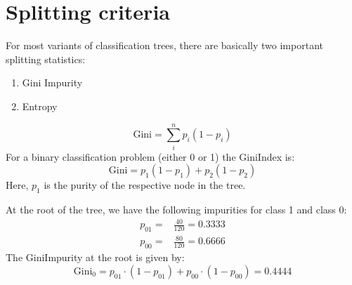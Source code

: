 \documentclass[letterpaper,10pt,english]{jupyterBook}
\begin{document}
\noindent{}


\section{Splitting criteria}
\label{\detokenize{Tree_Methods:splitting-criteria}}
\sphinxAtStartPar
For most variants of classification trees, there are basically two important splitting statistics:
\begin{enumerate}
%
\item {} 
\sphinxAtStartPar
Gini Impurity

\item {} 
\sphinxAtStartPar
Entropy

\end{enumerate}

\sphinxAtStartPar
{}
\label{equation:Tree_Methods:4ada277c-c74a-4ef0-a040-17abfa01fea7}\begin{equation}
\text{Gini} = \sum_i^n p_i (1-p_i)
\end{equation}
\sphinxAtStartPar
For a binary classification problem (either 0 or 1) the Gini\sphinxhyphen{}Index is:
\label{equation:Tree_Methods:0548df43-c4d3-4091-8e5f-0f20eb280f03}\begin{equation}
\text{Gini} = p_1 (1-p_1) + p_2 (1-p_2) 
\end{equation}
\sphinxAtStartPar
Here, \(p_1\) is the purity of the respective node in the tree.

\noindent{}

\sphinxAtStartPar
At the root of the tree, we have the following impurities for class 1 and class 0:
\begin{eqnarray*}
p_{01} =& \frac{40}{120} = 0.3333\\
p_{00} =& \frac{80}{120} = 0.6666
\end{eqnarray*}
\sphinxAtStartPar
The Gini\sphinxhyphen{}Impurity at the root is given by:
\label{equation:Tree_Methods:6200a050-dc38-4cd0-9e5e-a17bdfd8ee63}\begin{equation}
\text{Gini}_{0} = p_{01}\cdot (1-p_{01}) + p_{00}\cdot (1-p_{00}) = 0.4444
\end{equation}
\end{document}
